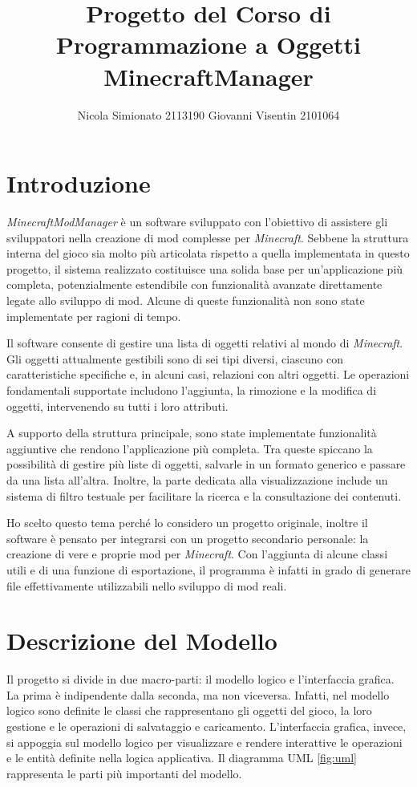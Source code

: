 \documentclass[12pt]{article}
\title{\textbf{Progetto del Corso di Programmazione a Oggetti}\\\large MinecraftManager}
\author{
  Nicola Simionato 2113190
  Giovanni Visentin 2101064
}
\begin{document}
\maketitle

\section{Introduzione}

\textit{MinecraftModManager} è un software sviluppato con l'obiettivo di assistere gli sviluppatori nella creazione di mod complesse per \textit{Minecraft}. Sebbene la struttura interna del gioco sia molto più articolata rispetto a quella implementata in questo progetto, il sistema realizzato costituisce una solida base per un’applicazione più completa, potenzialmente estendibile con funzionalità avanzate direttamente legate allo sviluppo di mod. Alcune di queste funzionalità non sono state implementate per ragioni di tempo.

Il software consente di gestire una lista di oggetti relativi al mondo di \textit{Minecraft}. Gli oggetti attualmente gestibili sono di sei tipi diversi, ciascuno con caratteristiche specifiche e, in alcuni casi, relazioni con altri oggetti. Le operazioni fondamentali supportate includono l'aggiunta, la rimozione e la modifica di oggetti, intervenendo su tutti i loro attributi.

A supporto della struttura principale, sono state implementate funzionalità aggiuntive che rendono l’applicazione più completa. Tra queste spiccano la possibilità di gestire più liste di oggetti, salvarle in un formato generico e passare da una lista all’altra. Inoltre, la parte dedicata alla visualizzazione include un sistema di filtro testuale per facilitare la ricerca e la consultazione dei contenuti.

Ho scelto questo tema perché lo considero un progetto originale, inoltre il software è pensato per integrarsi con un progetto secondario personale: la creazione di vere e proprie mod per \textit{Minecraft}. Con l’aggiunta di alcune classi utili e di una funzione di esportazione, il programma è infatti in grado di generare file effettivamente utilizzabili nello sviluppo di mod reali.

\section{Descrizione del Modello}

Il progetto si divide in due macro-parti: il modello logico e l'interfaccia grafica.  
La prima è indipendente dalla seconda, ma non viceversa. Infatti, nel modello logico sono definite le classi che rappresentano gli oggetti del gioco, la loro gestione e le operazioni di salvataggio e caricamento.  
L'interfaccia grafica, invece, si appoggia sul modello logico per visualizzare e rendere interattive le operazioni e le entità definite nella logica applicativa.
Il diagramma UML \ref{fig:uml} rappresenta le parti più importanti del modello.
\end{document}
